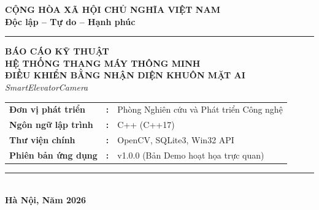 \documentclass[12pt,a4paper]{article}
\begin{document}
\begin{titlepage}
    \centering
    \large
    \textbf{CỘNG HÒA XÃ HỘI CHỦ NGHĨA VIỆT NAM} \\
    \textbf{Độc lập – Tự do – Hạnh phúc} \\
    \vspace{1.5cm}
    \rule{8cm}{1.5pt}
    \vspace{2.5cm}
    
    {\Huge \bfseries BÁO CÁO KỸ THUẬT} \\
    \vspace{0.8cm}
    {\Large \bfseries HỆ THỐNG THANG MÁY THÔNG MINH} \\
    \vspace{0.5cm}
    {\Large \bfseries ĐIỀU KHIỂN BẰNG NHẬN DIỆN KHUÔN MẶT AI} \\
    \vspace{1cm}
    {\large \textit{SmartElevatorCamera}} \\
    \vspace{3cm}
    
    \begin{table}[H]
        \large
        \centering
        \begin{tabular}{lll}
            \textbf{Đơn vị phát triển} & \textbf{:} & Phòng Nghiên cứu và Phát triển Công nghệ \\
            \textbf{Ngôn ngữ lập trình} & \textbf{:} & C++ (C++17) \\
            \textbf{Thư viện chính}    & \textbf{:} & OpenCV, SQLite3, Win32 API \\
            \textbf{Phiên bản ứng dụng} & \textbf{:} & v1.0.0 (Bản Demo hoạt họa trực quan) \\
        \end{tabular}
    \end{table}
    
    \vfill
    \rule{8cm}{0.5pt} \\
    \vspace{0.5cm}
    \textbf{Hà Nội, Năm 2026}
\end{titlepage}

\newpage
{}

\tableofcontents
\newpage
\end{document}
